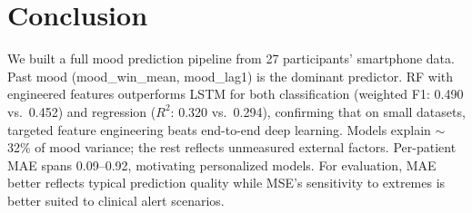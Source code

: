 \documentclass[runningheads]{llncs}
\begin{document}
\section{Conclusion}

We built a full mood prediction pipeline from 27 participants' smartphone data. Past mood (mood\_win\_mean, mood\_lag1) is the dominant predictor. RF with engineered features outperforms LSTM for both classification (weighted F1: 0.490 vs.\ 0.452) and regression ($R^2$: 0.320 vs.\ 0.294), confirming that on small datasets, targeted feature engineering beats end-to-end deep learning. Models explain $\sim$32\% of mood variance; the rest reflects unmeasured external factors. Per-patient MAE spans 0.09--0.92, motivating personalized models. For evaluation, MAE better reflects typical prediction quality while MSE's sensitivity to extremes is better suited to clinical alert scenarios.
\end{document}
